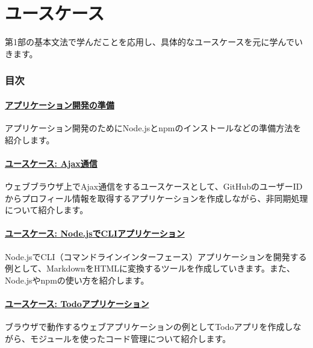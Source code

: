\hypertarget{use-case}{%
\part{ユースケース}\label{use-case}}

第1部の基本文法で学んだことを応用し、具体的なユースケースを元に学んでいきます。

\hypertarget{summary}{%
\section*{目次}\label{summary}}

\subsection*{\texorpdfstring{\hyperlink{setup-local-env}{アプリケーション開発の準備}}{アプリケーション開発の準備}}

アプリケーション開発のためにNode.jsとnpmのインストールなどの準備方法を紹介します。

\subsection*{\texorpdfstring{\hyperlink{usecase-ajax}{ユースケース: Ajax通信}}{ユースケース: Ajax通信}}

ウェブブラウザ上でAjax通信をするユースケースとして、GitHubのユーザーIDからプロフィール情報を取得するアプリケーションを作成しながら、非同期処理について紹介します。

\subsection*{\texorpdfstring{\hyperlink{node-cli}{ユースケース: Node.jsでCLIアプリケーション}}{ユースケース: Node.jsでCLIアプリケーション}}

Node.jsでCLI（コマンドラインインターフェース）アプリケーションを開発する例として、MarkdownをHTMLに変換するツールを作成していきます。また、Node.jsやnpmの使い方を紹介します。

\subsection*{\texorpdfstring{\hyperlink{todo-app}{ユースケース: Todoアプリケーション}}{ユースケース: Todoアプリケーション}}

ブラウザで動作するウェブアプリケーションの例としてTodoアプリを作成しながら、モジュールを使ったコード管理について紹介します。
